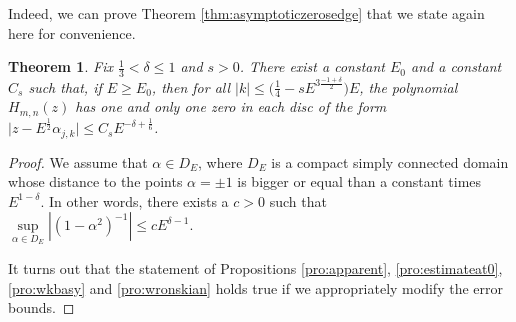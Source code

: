 \documentclass[pdftex]{sigma}
\numberwithin{equation}{section}
\newtheorem*{thm*}{Theorem}
\newcommand{\al}{\alpha}
\begin{document}
Indeed, we can prove Theorem \ref{thm:asymptoticzerosedge} that we state again here for convenience.
\begin{thm*}
	Fix $\frac13<\delta\leq1$ and $s >0$. There exist a constant $E_0$ and a constant $C_{s}$ such that, if $E\geq E_0$, then for all $|k|\leq \big( \frac{1}{4}-s E^{3\frac{-1+\delta}{2}} \big) E$, the polynomial $H_{m,n}(z)$ has one and only one zero in each disc of the form $\big|z-E^{\frac{1}{2}}\al_{j,k}\big|\leq C_s E^{-\delta+\frac16}$.
\end{thm*}
	\begin{proof} We assume that $\al \in D_E$, where $D_E$ is a compact simply connected domain whose distance to the points $\al=\pm1$ is bigger or equal than a constant times~$E^{1-\delta}$. In other words, there exists a $c>0$ such that $\sup\limits_{\al \in D_E}|(1-\al^2)^{-1}| \leq c E^{\delta-1}$.
		
It turns out that the statement of Propositions \ref{pro:apparent}, \ref{pro:estimateat0}, \ref{pro:wkbasy} and \ref{pro:wronskian} holds true if we appropriately modify the error bounds.
		

\end{proof}
\end{document}
